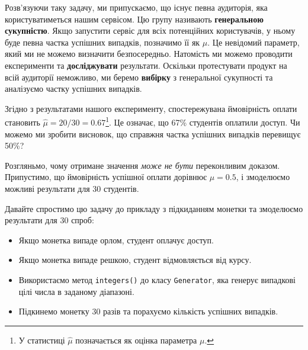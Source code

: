 \documentclass[
  letterpaper,
  10pt,
  openany]{report}
\providecommand{\tightlist}{%
  \setlength{\itemsep}{0pt}\setlength{\parskip}{0pt}}\usepackage{longtable,booktabs,array}
\theoremstyle{definition}
\theoremstyle{remark}
\begin{document}
Розв'язуючи таку задачу, ми припускаємо, що існує певна аудиторія, яка
користуватиметься нашим сервісом. Цю групу називають \textbf{генеральною
сукупністю}. Якщо запустити сервіс для всіх потенційних користувачів, у
ньому буде певна частка успішних випадків, позначимо її як \(\mu\). Це
невідомий параметр, який ми не можемо визначити безпосередньо. Натомість
ми можемо проводити експерименти та \textbf{досліджувати} результати.
Оскільки протестувати продукт на всій аудиторії неможливо, ми беремо
\textbf{вибірку} з генеральної сукупності та аналізуємо частку успішних
випадків.

Згідно з результатами нашого експерименту, спостережувана ймовірність
оплати становить \(\hat{\mu} = 20/30 = 0.67\)\footnote{У статистиці
  \(\hat{\mu}\) позначається як оцінка параметра \(\mu\).}. Це означає,
що 67\% студентів оплатили доступ. Чи можемо ми зробити висновок, що
справжня частка успішних випадків перевищує 50\%?

Розгляньмо, чому отримане значення \emph{може не бути} переконливим
доказом. Припустимо, що ймовірність успішної оплати дорівнює
\(\mu = 0.5\), і змоделюємо можливі результати для 30 студентів.

Давайте спростимо цю задачу до прикладу з підкиданням монетки та
змоделюємо результати для 30 спроб:

\begin{itemize}
\tightlist
\item
  Якщо монетка випаде орлом, студент оплачує доступ.
\item
  Якщо монетка випаде решкою, студент відмовляється від курсу.
\item
  Використаємо метод \texttt{integers()} до класу \texttt{Generator},
  яка генерує випадкові цілі числа в заданому діапазоні.
\item
  Підкинемо монетку 30 разів та порахуємо кількість успішних випадків.
\end{itemize}
\end{document}
